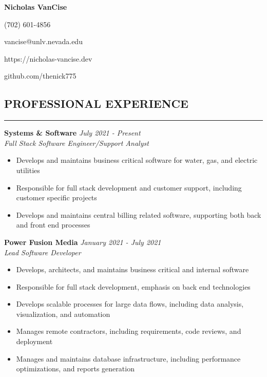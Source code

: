 \documentclass{res}
\begin{document}
	\thispagestyle{empty} %
	\centerline{\bf \Large{Nicholas VanCise}}
	\centerline{(702) 601-4856}
	\centerline{vancise@unlv.nevada.edu}
  \centerline{https://nicholas-vancise.dev}
  \centerline{github.com/thenick775}
  \vspace{-18pt}

	\begin{resume}

		\section{{PROFESSIONAL EXPERIENCE}}
    \noindent\rule[0.5ex]{\linewidth}{1pt}
    		{\bf Systems \& Software} \hfill \emph{July 2021 - Present} \\
			\emph{Full Stack Software Engineer/Support Analyst}

			\begin{itemize} \itemsep -2pt
				\item Develops and maintains business critical software for water, gas, and electric utilities
				\item Responsible for full stack development and customer support, including customer specific projects
				\item Develops and maintains central billing related software, supporting both back and front end processes
			\end{itemize} \vspace{-2mm}
			
	    {\bf Power Fusion Media} \hfill \emph{January 2021 - July 2021} \\
			\emph{Lead Software Developer}

			\begin{itemize} \itemsep -2pt
				\item Develops, architects, and maintains business critical and internal software
				\item Responsible for full stack development, emphasis on back end technologies
				\item Develops scalable processes for large data flows, including data analysis, visualization, and automation
				\item Manages remote contractors, including requirements, code reviews, and deployment
                \item Manages and maintains database infrastructure, including performance optimizations, and reports generation
			\end{itemize} \vspace{-2mm}
    

\end{resume}
\end{document}
